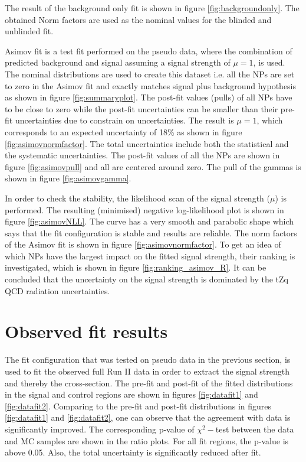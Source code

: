  The result of the background only fit is shown in figure \ref{fig:backgroundonly}. The obtained Norm factors are used as the nominal values for the blinded and unblinded fit.

Asimov fit is a test fit performed on the pseudo data, where the combination of predicted background and signal assuming a signal strength of $\mu = 1$, is used. The nominal distributions are used to create this dataset i.e. all the NPs are set to zero in the Asimov fit and exactly matches signal plus background hypothesis as shown in figure \ref{fig:summaryplot}. The post-fit values (pulls) of all NPs have to be close to zero while the post-fit uncertainties can be smaller than their pre-fit uncertainties due to constrain on uncertainties. The result is $\mu =1$, which corresponds to an expected uncertainty of 18\% as shown in figure \ref{fig:asimovnormfactor}. The total uncertainties include both the statistical and the systematic uncertainties. The post-fit values of all the NPs are shown in figure \ref{fig:asimovpull} and all are centered around zero. The pull of the gammas is shown in figure \ref{fig:asimovgamma}.

In order to check the stability, the likelihood scan of the signal strength ($\mu$) is performed. The resulting (minimised) negative log-likelihood plot is shown in figure \ref{fig:asimovNLL}. The curve has a very smooth and parabolic shape which says that the fit configuration is stable and results are reliable. The norm factors of the Asimov fit is shown in figure \ref{fig:asimovnormfactor}. To get an idea of which NPs have the largest impact on the fitted signal strength, their ranking is investigated, which is shown in figure \ref{fig:ranking_asimov_R}. It can be concluded that the uncertainty on the signal strength is dominated by the tZq QCD radiation uncertainties.  


\section{Observed fit results}
\label{sec:observedfitresults}

The fit configuration that was tested on pseudo data in the previous section, is used to fit the observed full Run II data in order to extract the signal strength and thereby the cross-section. The pre-fit and post-fit of the fitted distributions in the signal and control regions are shown in figures \ref{fig:datafit1} and \ref{fig:datafit2}. Comparing to the pre-fit  and post-fit distributions in figures  \ref{fig:datafit1} and \ref{fig:datafit2}, one can observe that the agreement with data is significantly improved. The corresponding p-value of $\chi^{2}-$test between the data and MC samples are shown in the ratio plots. For all fit regions, the p-value is above 0.05. Also, the total uncertainty is significantly reduced after fit. 

